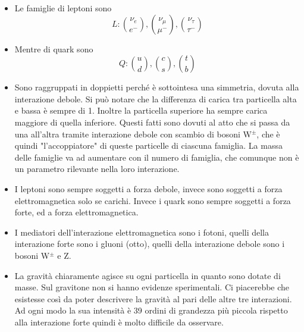 \begin{itemize}
    \item Le famiglie di leptoni sono 
        \begin{equation*}
            L: \binom{\nu_e}{e^-}, \binom{\nu_\mu}{\mu^-}, \binom{\nu_\tau}{\tau^-}
        \end{equation*}
    \item Mentre di quark sono
        \begin{equation*}
            Q: \binom{u}{d}, \binom{c}{s}, \binom{t}{b}
        \end{equation*}
    \item Sono raggruppati in doppietti perché è sottointesa una simmetria, dovuta alla interazione debole. Si può notare che la differenza di carica tra particella alta e bassa è sempre di 1. Inoltre la particella superiore ha sempre carica maggiore di quella inferiore. Questi fatti sono dovuti al atto che si passa da una all'altra tramite interazione debole con scambio di bosoni W$^\pm$, che è quindi "l'accoppiatore" di queste particelle di ciascuna famiglia. La massa delle famiglie va ad aumentare con il numero di famiglia, che comunque non è un parametro rilevante nella loro interazione.
    \item I leptoni sono sempre soggetti a forza debole, invece sono soggetti a forza elettromagnetica solo se carichi. Invece i quark sono sempre soggetti a forza forte, ed a forza elettromagnetica.
    \item I mediatori dell'interazione elettromagnetica sono i fotoni, quelli della interazione forte sono i gluoni (otto), quelli della interazione debole sono i bosoni W$^\pm$ e Z.
    \item La gravità chiaramente agisce su ogni particella in quanto sono dotate di masse. Sul gravitone non si hanno evidenze sperimentali. Ci piacerebbe che esistesse così da poter descrivere la gravità al pari delle altre tre interazioni. Ad ogni modo la sua intensità è 39 ordini di grandezza più piccola rispetto alla interazione forte quindi è molto difficile da osservare.
\end{itemize}
